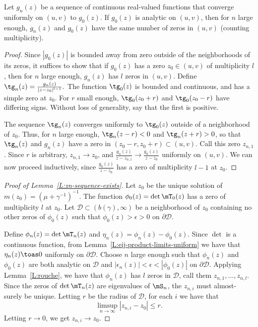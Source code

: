 \begin{lemma}
    Let $g_n(z)$ be a sequence of continuous real-valued functions that 
    converge uniformly on $(u,v)$ to $g_0(z)$.  If $g_0(z)$ is analytic
    on $(u,v)$, then for $n$ large enough, $g_n(z)$ and $g_0(z)$ have the
    same number of zeros in $(u,v)$ (counting multiplicity).
\end{lemma}
\begin{proof}
    Since $|g_0(z)|$ is bounded away from zero outside of the neighborhoods
    of its zeros, it suffices to show that if $g_0(z)$ has a zero 
    $z_0 \in (u,v)$ of multiplicity $l$, then for $n$ large enough, 
    $g_n(z)$ has $l$ zeros in $(u,v)$.  Define
    \(
        \tg_n(z) = \frac{g_n(z)}{|z - z_0|^{l-1}}.
    \)
    The function $\tg_0(z)$ is bounded and continuous, and has a 
    simple zero at $z_0$.  For $r$ small enough, $\tg_0(z_0 + r)$ and
    $\tg_0(z_0 - r)$ have differing signs.  Without loss of generality,
    say that the first is positive.  
    
    The sequence $\tg_n(z)$ converges uniformly to $\tg_0(z)$ outside of
    a neighborhood of $z_0$.  Thus, for $n$ large enough, $\tg_n(z-r) < 0$
    and $\tg_n(z+r) > 0$, so that $\tg_n(z)$ and $g_n(z)$ have a zero
    in $(z_0-r,z_0+r) \subset (u,v)$.  Call this zero $z_{n,1}$.  Since
    $r$ is arbitrary, $z_{n,1} \to z_0$, and
    $\frac{g_n(z)}{z - z_{n,1}} \to \frac{g_0(z)}{z - z_0}$ uniformly on
    $(u,v)$.  We can now proceed inductively, since $\frac{g_0(z)}{z - z_0}$
    has a zero of multiplicity $l-1$ at $z_0$.
\end{proof}

\begin{proof}[Proof of Lemma~\ref{L:zn-sequence-exists}]
    Let $z_0$ be the unique solution of 
    $m(z_0) = (\mu + \gamma^{-1})^{-1}$.  The function
    $\phi_0(z) = \det \mT_0(z)$ has a zero of multiplicity $l$ at $z_0$.  Let
    $\mathcal{D} \subset (b(\gamma), \infty)$ be a neighborhood of
    $z_0$ containing no other zeros of $\phi_0(z)$ such that 
    $\phi_0(z) > \epsilon > 0$ on $\partial \mathcal{D}$.
    
    Define $\phi_n(z) = \det \mT_n(z)$ and 
    $\eta_n(z) = \phi_n(z) - \phi_0(z)$.  Since $\det$ is a continuous 
    function, from Lemma~\ref{L:eij-product-limits-uniform} 
    we have that $\eta_n(z) \toas 0$ uniformly on $\partial \mathcal{D}$.
    Choose $n$ large enough such that $\phi_n(z)$ 
    and $\phi_0(z)$ are both analytic on $\mathcal{D}$ and
    $|\epsilon_n(z) | < \epsilon < |\phi_0(z) |$ on $\partial \mathcal{D}$.
    Applying Lemma~\ref{L:rouche}, we have that $\phi_n(z)$ has $l$ zeros
    in $\mathcal{D}$, call them $z_{n,1}, \ldots, z_{n,l}$.  Since the
    zeros of $\det \mT_n(z)$ are eigenvalues of $\mS_n$, the $z_{n,i}$ must
    almost-surely be unique.  Letting $r$ be the radius of $\mathcal{D}$, for
    each $i$ we have that
    \[
        \limsup_{n \to \infty} | z_{n,i} - z_0 | \leq r.
    \]
    Letting $r \to 0$, we get $z_{n,i} \to z_0$.
\end{proof}



